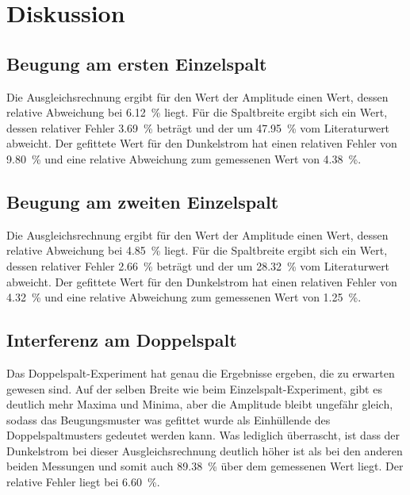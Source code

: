 \section{Diskussion}
\label{sec:Diskussion}


\subsection{Beugung am ersten Einzelspalt}
Die Ausgleichsrechnung ergibt für den Wert der Amplitude einen Wert, dessen relative Abweichung bei \SI{6.12}{\percent} liegt. Für die Spaltbreite ergibt sich ein Wert, dessen relativer Fehler \SI{3.69}{\percent} beträgt und der um \SI{47.95}{\percent} vom Literaturwert abweicht.
Der gefittete Wert für den Dunkelstrom hat einen relativen Fehler von \SI{9.80}{\percent} und eine relative Abweichung zum gemessenen Wert von \SI{4.38}{\percent}.


\subsection{Beugung am zweiten Einzelspalt}
Die Ausgleichsrechnung ergibt für den Wert der Amplitude einen Wert, dessen relative Abweichung bei \SI{4.85}{\percent} liegt. Für die Spaltbreite ergibt sich ein Wert, dessen relativer Fehler \SI{2.66}{\percent} beträgt und der um \SI{28.32}{\percent} vom Literaturwert abweicht.
Der gefittete Wert für den Dunkelstrom hat einen relativen Fehler von \SI{4.32}{\percent} und eine relative Abweichung zum gemessenen Wert von \SI{1.25}{\percent}.

\subsection{Interferenz am Doppelspalt}
Das Doppelspalt-Experiment hat genau die Ergebnisse ergeben, die zu erwarten gewesen sind. Auf der selben Breite  wie beim Einzelspalt-Experiment, gibt es deutlich mehr Maxima und Minima, aber die Amplitude bleibt ungefähr gleich, sodass das Beugungsmuster was gefittet wurde als Einhüllende des Doppelspaltmusters gedeutet werden kann. Was lediglich überrascht, ist dass der Dunkelstrom bei dieser Ausgleichsrechnung deutlich höher ist als bei den anderen beiden Messungen und somit auch \SI{89.38}{\percent} über dem gemessenen Wert liegt. Der relative Fehler liegt bei \SI{6.60}{\percent}.

